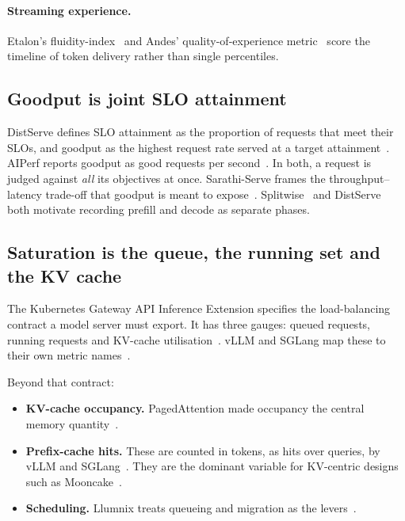 \documentclass[11pt]{article}
\begin{document}
\paragraph{Streaming experience.} Etalon's fluidity-index~\citep{agrawal2024etalon} and Andes'
quality-of-experience metric~\citep{liu2024andes} score the timeline of token delivery rather than
single percentiles.

\subsection{Goodput is joint SLO attainment}

DistServe defines SLO attainment as the proportion of requests that meet their SLOs, and goodput as
the highest request rate served at a target attainment~\citep{zhong2024distserve}. AIPerf reports
goodput as good requests per second~\citep{nvidia_aiperf}. In both, a request is judged against
\emph{all} its objectives at once. Sarathi-Serve frames the throughput--latency trade-off that
goodput is meant to expose~\citep{agrawal2024sarathi}. Splitwise~\citep{patel2023splitwise} and
DistServe both motivate recording prefill and decode as separate phases.

\subsection{Saturation is the queue, the running set and the KV cache}

The Kubernetes Gateway API Inference Extension specifies the load-balancing contract a model server
must export. It has three gauges: queued requests, running requests and KV-cache
utilisation~\citep{gie_msp}. vLLM and SGLang map these to their own metric
names~\citep{vllm_metrics,sglang_metrics}.

Beyond that contract:
\begin{itemize}
\item \textbf{KV-cache occupancy.} PagedAttention made occupancy the central memory
quantity~\citep{kwon2023pagedattention}.
\item \textbf{Prefix-cache hits.} These are counted in tokens, as hits over queries, by vLLM and
SGLang~\citep{vllm_metrics,sglang_metrics}. They are the dominant variable for KV-centric designs
such as Mooncake~\citep{qin2024mooncake}.
\item \textbf{Scheduling.} Llumnix treats queueing and migration as the levers~\citep{sun2024llumnix}.
\end{itemize}
\end{document}
